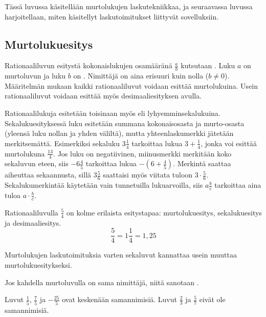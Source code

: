 Tässä luvussa käsitellään murtolukujen laskutekniikkaa, ja seuraavassa luvussa harjoitellaan, miten käsitellyt laskutoimitukset liittyvät sovelluksiin.

\subsection{Murtolukuesitys}
Rationaaliluvun esitystä kokonaislukujen osamääränä $\frac{a}{b}$ kutsutaan . Luku $a$ on murtoluvun  ja luku $b$ on . Nimittäjä on aina erisuuri kuin nolla ($b\neq0 $). Määritelmän mukaan kaikki rationaaliluvut voidaan esittää murtolukuina. Usein rationaaliluvut voidaan esittää myös desimaaliesityksen avulla. %

Rationaalilukuja esitetään toisinaan myös  eli lyhyemminsekalukuina. Sekalukuesityksessä luku esitetään summana kokonaisosasta ja murto-osasta (yleensä luku nollan ja yhden väliltä), mutta yhteenlaskumerkki jätetään merkitsemättä. Esimerkiksi sekaluku $3\frac{1}{4}$ tarkoittaa lukua $3 + \frac{1}{4}$, jonka voi esittää murtolukuna $\frac{13}{4}$. Jos luku on negatiivinen, miinusmerkki merkitään koko sekaluvun eteen, siis $-6\frac{4}{5}$ tarkoittaa lukua $-(6 + \frac{4}{5})$. Merkintä saattaa aiheuttaa sekaannusta, sillä $3\frac{5}{6}$ saattaisi myös viitata tuloon $3\cdot \frac{5}{6}$. Sekalukumerkintää käytetään vain tunnetuilla lukuarvoilla, siis $a\frac{b}{c}$ tarkoittaa aina tuloa $a\cdot \frac{b}{c}$. 

\begin{esimerkki}
        Rationaaliluvulla $\frac{5}{4}$ on kolme erilaista esitystapaa: murtolukuesitys, sekalukuesitys ja desimaaliesitys.
        \[\frac{5}{4} = 1\frac{1}{4}=1,25 \]
\end{esimerkki} %

Murtolukujen laskutoimituksia varten sekaluvut kannattaa usein muuttaa murtolukuesitykseksi. 
\newpage

Jos kahdella murtoluvulla on sama nimittäjä, niitä sanotaan . %

\begin{esimerkki}
Luvut $\frac15$, $\frac75$ ja $-\frac{25}{5}$ ovat keskenään samannimisiä. Luvut $\frac23$ ja $\frac57$ eivät ole samannimisiä.
\end{esimerkki}

